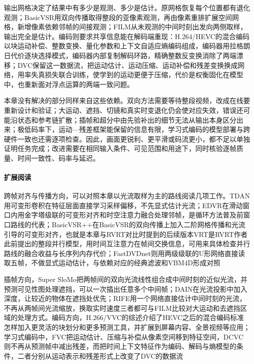 输出网格决定了结果中有多少是观测、多少是估计。原网格恢复每个位置都有退化观测；BasicVSR用双向传播取得整段的亚像素观测，再由像素重排扩展空间网格，新增像素依赖邻帧的间接观测；FILM从未观测的中间时刻出发向两侧取样，输出完全是估计。编码则要求共享信息能在解码端重现：H.264/HEVC的混合编码以块运动补偿、整数变换、量化参数和上下文自适应熵编码组成，编码器用拉格朗日代价逐块选择模式，编码器内部复制解码环路，精确整数反变换消除了两端漂移；DVC保留这一数据流，把运动估计、运动压缩、运动补偿和残差变换换成网络，用率失真损失联合训练，使学到的运动更便于压缩，代价是权衡固化在模型中，也重新面对浮点运算的两端一致问题。

本章没有解决的部分同样来自这些依赖。双向方法需要等待整段视频，改成在线要重新设计和验证；大运动、遮挡、切镜和真实时变退化仍会使对应失效，错误还可能沿状态和参考链扩散；插帧和超分中由先验补出的细节无法从输出本身区分出来；极低码率下，运动—残差框架能保留的信息有限，学习式编码的模型部署与跨硬件一致也还需逐项检查。因此，画面更锐利、更平滑或码流更小，都不足以单独证明任务完成；改进需要在相同输入条件、可见范围和用途下，同时核验逐帧质量、时间一致性、码率与延迟。

\paragraph{扩展阅读}
跨帧对齐与传播方向，可以对照本章以光流取样为主的路线阅读几项工作。TDAN用可变形卷积在特征层面直接学习采样偏移，不先显式估计光流；EDVR在滑动窗口内用金字塔级联的可变形对齐和时空注意力融合处理邻帧，是循环方法普及前窗口路线的代表；BasicVSR++在BasicVSR的双向传播上加入二阶网格传播和光流引导的可变形对齐，也就是本章与RVRT对比时提到的后续版本VRT是RVRT作者此前提出的整段并行模型，用时间互注意力在帧间交换信息，可用来具体检查并行路线的融合收益与长序列内存代价；FastDVDnet则用两级级联的U形网络直接读取五帧，不做显式运动估计，与依赖对应的经典滤波和VBM4D形成对照

插帧方向，Super SloMo把两帧间的双向光流线性组合成中间时刻的近似光流，并预测可见性图处理遮挡，可以一次插出任意多个中间帧；DAIN在光流投影中加入深度，让较近的物体在遮挡处优先；RIFE用一个网络直接估计中间时刻的光流，不再从两帧间光流缩放，换取实时速度三者都可与FILM比较对大运动和去遮挡区域的处理方式。编码方向，H.266/VVC的综述介绍了HEVC之后的混合编码标准怎样加入更灵活的块划分和更多预测工具，并扩展到屏幕内容、全景视频等应用；学习式编码中，FVC把运动估计、压缩与补偿从像素空间移到特征空间，DCVC则不再从预测帧中减出残差，而把时间上下文特征作为编码、解码与熵模型的条件，二者分别从运动表示和残差形式上改变了DVC的数据流
